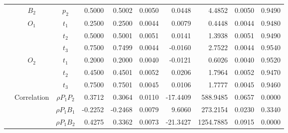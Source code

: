 \documentclass[letterpaper]{article}
\begin{document}
\begin{table}[h]
\begin{tabular}{cccrrrrrrr}
            & $B_2$       & $p_2$          & 0.5000                 & 0.5002                 & 0.0050                 & 0.0448                 & 4.4852                 & 0.0050                   & 0.9490                 \\
            & $O_1$       & $t_1$          & 0.2500                 & 0.2500                 & 0.0044                 & 0.0079                 & 0.4448                 & 0.0044                   & 0.9480                 \\
            &             & $t_2$          & 0.5000                 & 0.5001                 & 0.0051                 & 0.0141                 & 1.3938                 & 0.0051                   & 0.9490                 \\
            &             & $t_3$          & 0.7500                 & 0.7499                 & 0.0044                 & -0.0160                & 2.7522                 & 0.0044                   & 0.9540                 \\
            & $O_2$       & $t_1$          & 0.2000                 & 0.2000                 & 0.0040                 & -0.0121                & 0.6026                 & 0.0040                   & 0.9520                 \\
            &             & $t_2$          & 0.4500                 & 0.4501                 & 0.0052                 & 0.0206                 & 1.7964                 & 0.0052                   & 0.9470                 \\
            &             & $t_3$          & 0.7500                 & 0.7501                 & 0.0045                 & 0.0106                 & 1.7777                 & 0.0045                   & 0.9460                 \\
            & Correlation & $\rho{P_1P_2}$ & 0.3712                 & 0.3064                 & 0.0110                 & -17.4409               & 588.9485               & 0.0657                   & 0.0000                 \\
            &             & $\rho{P_1B_1}$ & -0.2252                & -0.2468                & 0.0079                 & 9.6060                 & 273.2154               & 0.0230                   & 0.3340                 \\
            &             & $\rho{P_1B_2}$ & 0.4275                 & 0.3362                 & 0.0073                 & -21.3427               & 1254.7885              & 0.0915                   & 0.0000                 \\

\end{tabular}
\end{table}
\end{document}
